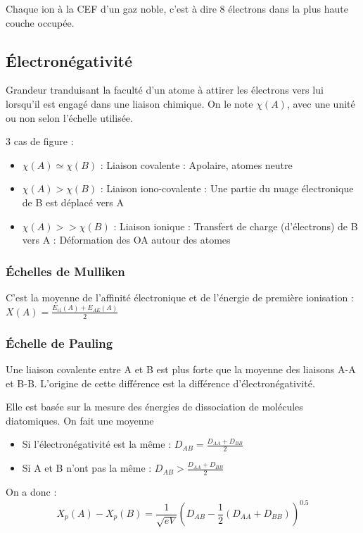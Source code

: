 \documentclass[french]{yLectureNote}
\begin{document}
Chaque ion à la CEF d'un gaz noble, c'est à dire 8 électrons dans la plus haute couche occupée.
\subsection{Électronégativité}
Grandeur tranduisant la faculté d'un atome à attirer les électrons vers lui lorsqu'il est engagé dans une liaison chimique.
On le note $\chi(A)$, avec une unité ou non selon l'échelle utilisée.

3 cas de figure :
\begin{itemize}
 \item $\chi(A)\simeq\chi(B)$ : Liaison covalente : Apolaire, atomes neutre
 \item $\chi(A)>\chi(B)$ : Liaison iono-covalente : Une partie du nuage électronique de B est déplacé vers A
  \item $\chi(A)>>\chi(B)$ : Liaison ionique : Transfert de charge (d'électrons) de B vers A : Déformation des OA autour des atomes
\end{itemize}
\subsubsection{Échelles de Mulliken}
C'est la moyenne de l'affinité électronique et de l'énergie de première ionisation : $X(A) = \frac{E_{i1}(A)+E_{AE}(A)}{2}$
\subsubsection{Échelle de Pauling}
Une liaison covalente entre A et B est plus forte que la moyenne des liaisons A-A et B-B. L'origine de cette différence est la différence d'électronégativité.

Elle est basée sur la mesure des énergies de dissociation de molécules diatomiques. On fait une moyenne

\begin{itemize}
 \item Si l'électronégativité est la m\^eme : $D_{AB} = \frac{D_{AA}+D_{BB}}{2}$
  \item Si A et B n'ont pas la m\^eme : $D_{AB} > \frac{D_{AA}+D_{BB}}{2}$
\end{itemize}
On a donc :
\[X_p(A)-X_p(B) = \frac{1}{\sqrt{eV}}(D_{AB}-\frac{1}{2}(D_{AA}+D_{BB}))^{0.5}\]
\end{document}
